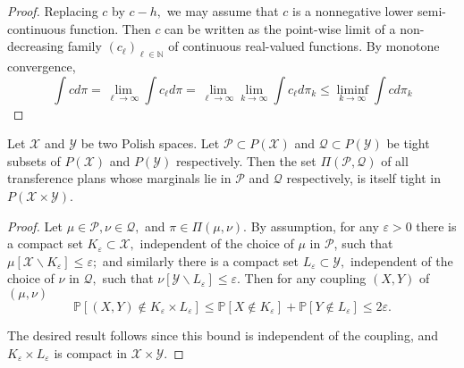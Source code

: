 \begin{proof}
	Replacing \( c \) by \( c - h , \) we may assume that \( c \) is a nonnegative lower semi-continuous function. Then \( c \) can be written as the point-wise limit of a non-decreasing family \( \left( c _ { \ell } \right) _ { \ell \in \mathbb { N } } \) of continuous real-valued functions. By monotone convergence,
	\[ \int c d \pi = \lim _ { \ell \rightarrow \infty } \int c _ { \ell } d \pi = \lim _ { \ell \rightarrow \infty } \lim _ { k \rightarrow \infty } \int c _ { \ell } d \pi _ { k } \leq \liminf _ { k \rightarrow \infty } \int c d \pi _ { k } \]
\end{proof}
\begin{lem}
	Let \( \mathcal { X } \) and \( \mathcal { Y } \) be two Polish spaces. Let \( \mathcal { P } \subset P ( \mathcal { X } ) \) and \( \mathcal { Q } \subset P ( \mathcal { Y } ) \) be tight subsets of \( P ( \mathcal { X } ) \) and \( P ( \mathcal { Y } ) \) respectively. Then the set \( \Pi ( \mathcal { P } , \mathcal { Q } ) \) of all transference plans whose marginals lie in \( \mathcal { P } \) and \( \mathcal { Q } \) respectively, is itself tight in \( P ( \mathcal { X } \times \mathcal { Y } ) \).
\end{lem}

\begin{proof}
	Let \( \mu \in \mathcal { P } , \nu \in \mathcal { Q } , \) and \( \pi \in \Pi ( \mu , \nu ) . \) By assumption, for any \( \varepsilon > 0 \) there is a compact set \( K _ { \varepsilon } \subset \mathcal { X } , \) independent of the choice of \( \mu \) in \( \mathcal { P } \), such that \( \mu \left[ \mathcal { X } \backslash K _ { \varepsilon } \right] \leq \varepsilon ; \) and similarly there is a compact set \( L _ { \varepsilon } \subset \mathcal { Y } , \) independent of the choice of \( \nu \) in \( \mathcal { Q } , \) such that \( \nu \left[ \mathcal { Y } \backslash L _ { \varepsilon } \right] \leq \varepsilon . \) Then for any coupling \( ( X , Y ) \) of \( ( \mu , \nu ) \)
	\[ \mathbb { P } \left[ ( X , Y ) \notin K _ { \varepsilon } \times L _ { \varepsilon } \right] \leq \mathbb { P } \left[ X \notin K _ { \varepsilon } \right] + \mathbb { P } \left[ Y \notin L _ { \varepsilon } \right] \leq 2 \varepsilon. \]

	The desired result follows since this bound is independent of the coupling, and \( K _ { \varepsilon } \times L _ { \varepsilon } \) is compact in \( \mathcal { X } \times \mathcal { Y }  \).
\end{proof}

